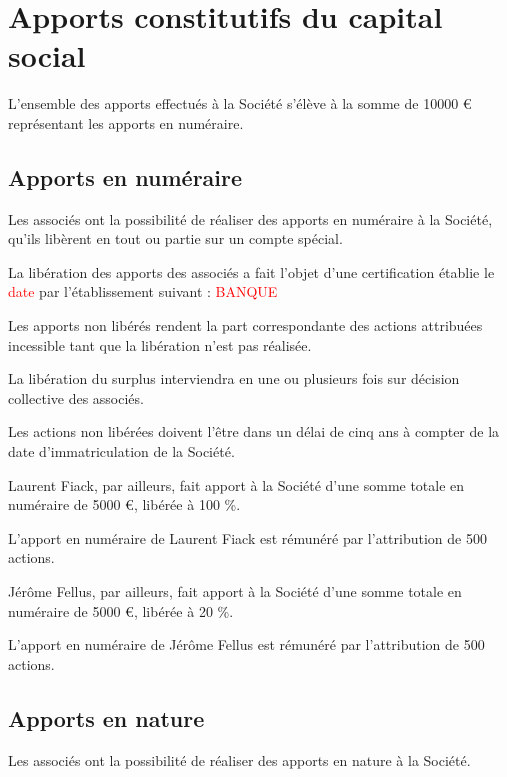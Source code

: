 \documentclass[a4paper,12pt]{report}
\begin{document}
\section{Apports constitutifs du capital social}

L'ensemble des apports effectués à la Société s'élève à la somme de 10000 € représentant les apports en numéraire.\\

\subsection{Apports en numéraire}
Les associés ont la possibilité de réaliser des apports en numéraire à la Société, qu'ils libèrent en tout ou partie sur un compte spécial.

La libération des apports des associés a fait l'objet d'une certification établie le \textcolor{red}{date} par l'établissement suivant : \textcolor{red}{BANQUE}

Les apports non libérés rendent la part correspondante des actions attribuées incessible tant que la libération n'est pas réalisée.

La libération du surplus interviendra en une ou plusieurs fois sur décision collective des associés.

Les actions non libérées doivent l'être dans un délai de cinq ans à compter de la date d'immatriculation de la Société.

Laurent Fiack, par ailleurs, fait apport à la Société d'une somme totale en numéraire de 5000 €, libérée à 100 \%.

L'apport en numéraire de Laurent Fiack est rémunéré par l'attribution de 500 actions.

Jérôme Fellus, par ailleurs, fait apport à la Société d'une somme totale en numéraire de 5000 €, libérée à 20 \%.

L'apport en numéraire de Jérôme Fellus est rémunéré par l'attribution de 500 actions.

\subsection{Apports en nature}
Les associés ont la possibilité de réaliser des apports en nature à la Société.
\end{document}
